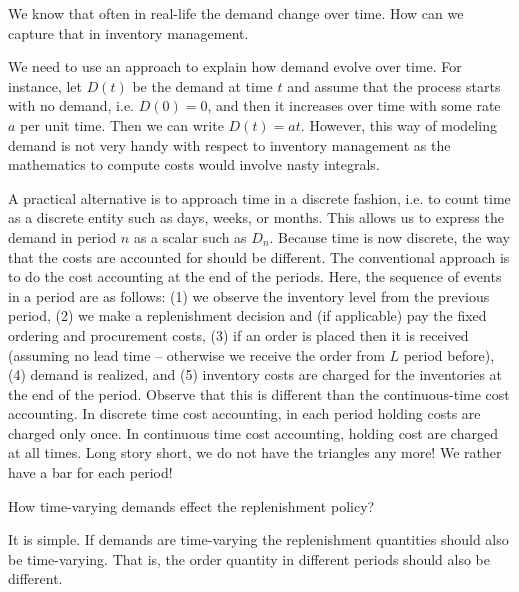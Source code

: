 \begin{exercise}
We know that often in real-life the demand change over time. How can we capture that in inventory management.


\begin{solution}
We need to use an approach to explain how demand evolve over time. For instance, let $D(t)$ be the demand at time $t$ and assume that the process starts with no demand, i.e. $D(0)=0$, and then it increases over time with some rate $a$ per unit time. Then we can write $D(t)=at$. However, this way of modeling demand is not very handy with respect to inventory management as the mathematics to compute costs would involve nasty integrals. 

A practical alternative is to approach time in a discrete fashion, i.e. to count time as a discrete entity such as days, weeks, or months. This allows us to express the demand in period $n$ as a scalar such as $D_n$. Because time is now discrete, the way that the costs are accounted for should be different. The conventional approach is to do the cost accounting at the end of the periods. Here, the sequence of events in a period are as follows: (1) we observe the inventory level from the previous period, (2) we make a replenishment decision and (if applicable) pay the fixed ordering and procurement costs, (3) if an order is placed then it is received (assuming no lead time -- otherwise we receive the order from $L$ period before), (4) demand is realized, and (5) inventory costs are charged for the inventories at the end of the period. Observe that this is different than the continuous-time cost accounting. In discrete time cost accounting, in each period holding costs are charged only once. In continuous time cost accounting, holding cost are charged at all times. Long story short, we do not have the triangles any more! We rather have a bar for each period! 
\end{solution}
\end{exercise}

\begin{exercise}
How time-varying demands effect the replenishment policy?


\begin{solution}
It is simple. If demands are time-varying the replenishment quantities should also be time-varying. That is, the order quantity in different periods should also be different. 
\end{solution}
\end{exercise}


